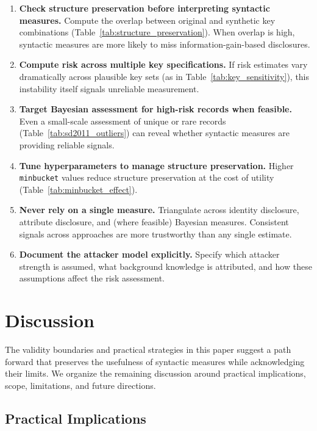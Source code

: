 \documentclass[Afour,sageh,times,doublespace]{sagej}
\begin{document}
\begin{enumerate}
\item \textbf{Check structure preservation before interpreting syntactic measures.} Compute the overlap between original and synthetic key combinations (Table~\ref{tab:structure_preservation}). When overlap is high, syntactic measures are more likely to miss information-gain-based disclosures.
\item \textbf{Compute risk across multiple key specifications.} If risk estimates vary dramatically across plausible key sets (as in Table~\ref{tab:key_sensitivity}), this instability itself signals unreliable measurement.
\item \textbf{Target Bayesian assessment for high-risk records when feasible.} Even a small-scale assessment of unique or rare records (Table~\ref{tab:sd2011_outliers}) can reveal whether syntactic measures are providing reliable signals.
\item \textbf{Tune hyperparameters to manage structure preservation.} Higher \texttt{minbucket} values reduce structure preservation at the cost of utility (Table~\ref{tab:minbucket_effect}).
\item \textbf{Never rely on a single measure.} Triangulate across identity disclosure, attribute disclosure, and (where feasible) Bayesian measures. Consistent signals across approaches are more trustworthy than any single estimate.
\item \textbf{Document the attacker model explicitly.} Specify which attacker strength is assumed, what background knowledge is attributed, and how these assumptions affect the risk assessment.
\end{enumerate}



\section{Discussion}
\label{sec:discussion}

The validity boundaries and practical strategies in this paper suggest a path forward that preserves the usefulness of syntactic measures while acknowledging their limits. We organize the remaining discussion around practical implications, scope, limitations, and future directions.

\subsection{Practical Implications}
\end{document}
